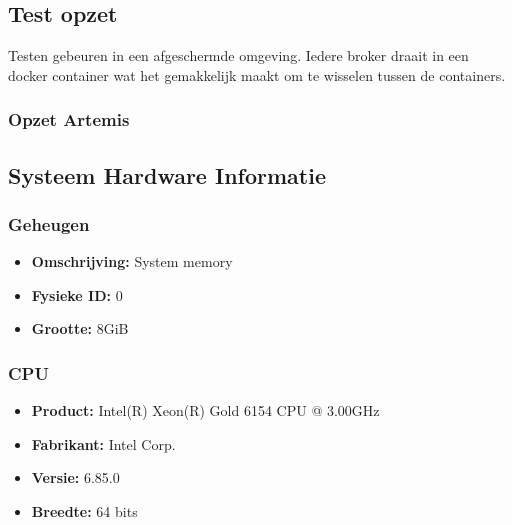 \subsection{Test opzet}
Testen gebeuren in een afgeschermde omgeving.
Iedere broker draait in een docker container wat het gemakkelijk maakt om te wisselen tussen de containers.

\subsubsection{Opzet Artemis}

\subsection{Systeem Hardware Informatie}
\subsubsection*{Geheugen}
\begin{itemize}
    \item \textbf{Omschrijving:} System memory
    \item \textbf{Fysieke ID:} 0
    \item \textbf{Grootte:} 8GiB
\end{itemize}

\subsubsection*{CPU}
\begin{itemize}
    \item \textbf{Product:} Intel(R) Xeon(R) Gold 6154 CPU @ 3.00GHz
    \item \textbf{Fabrikant:} Intel Corp. 
    \item \textbf{Versie:} 6.85.0
    \item \textbf{Breedte:} 64 bits
\end{itemize}

 




